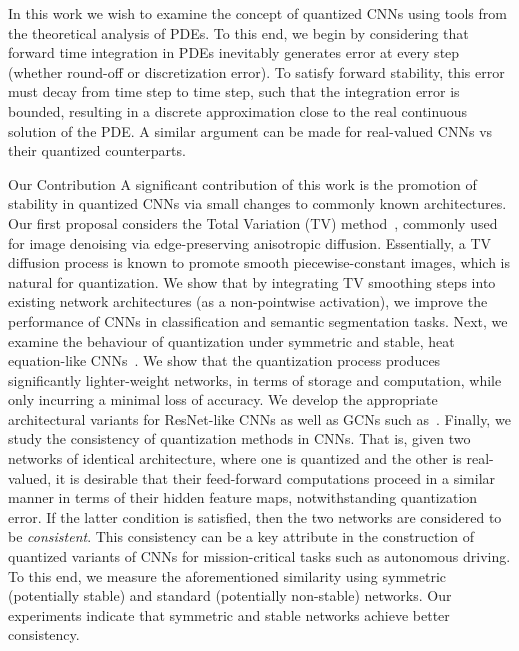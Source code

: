 \documentclass[reqno]{amsart}
\makeatletter
\def\paragraph{\@startsection{paragraph}{4}%
  \z@\z@{-\fontdimen2\font}%
  {\normalfont\bfseries}}
\makeatother
\begin{document}
In this work we wish to examine the concept of quantized CNNs using tools from the theoretical analysis of PDEs. To this end, we begin by considering that forward time integration in PDEs inevitably generates error at every step (whether round-off or discretization error). To satisfy forward stability, this error must decay from time step to time step, such that the integration error is bounded, resulting in a discrete approximation close to the real continuous solution of the PDE. A similar argument can be made for real-valued CNNs vs their quantized counterparts.

\paragraph{Our Contribution}
A significant contribution of this work is the promotion of stability in quantized CNNs via small changes to commonly known architectures.
Our first proposal considers the Total Variation (TV) method~\cite{RudinOsherFatemi1992}, commonly used for image denoising via edge-preserving anisotropic diffusion. Essentially, a TV diffusion process is known to promote smooth piecewise-constant images, which is natural for quantization. We show that by integrating TV smoothing steps into existing network architectures (as a non-pointwise activation), we improve the performance of CNNs in classification and semantic segmentation tasks.
Next, we examine the behaviour of quantization under symmetric and stable, heat equation-like CNNs~\cite{HaberRuthotto2017,alt2021translating,alt2021connections}. We show that the quantization process produces significantly lighter-weight networks, in terms of storage and computation, while only incurring a minimal loss of accuracy. We develop the appropriate architectural variants for ResNet-like CNNs as well as GCNs such as~\cite{eliasof2021pdegcn}.
Finally, we study the consistency of quantization methods in CNNs. That is, given two networks of identical architecture, where one is quantized and the other is real-valued, it is desirable that their feed-forward computations proceed in a similar manner in terms of their hidden feature maps, notwithstanding quantization error. If the latter condition is satisfied, then the two networks are considered to be \textit{consistent}. This consistency can be a key attribute in the construction of quantized variants of CNNs for mission-critical tasks such as autonomous driving. 
To this end, we measure the aforementioned similarity using symmetric (potentially stable) and standard (potentially non-stable) networks. Our experiments indicate that symmetric and stable networks achieve better consistency.
\end{document}
